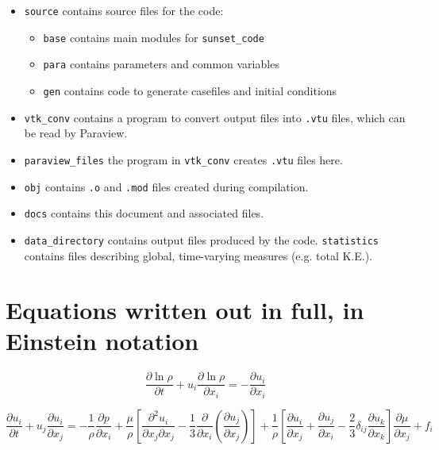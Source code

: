 \documentclass[notitlepage]{revtex4-1}
\begin{document}
\begin{itemize}
\item \verb|source| contains source files for the code:
\begin{itemize}
\item \verb|base| contains main modules for \verb|sunset_code|
\item \verb|para| contains parameters and common variables
\item \verb|gen| contains code to generate casefiles and initial conditions
\end{itemize}
\item \verb|vtk_conv| contains a program to convert output files into \verb|.vtu| files, which can be read by Paraview.
\item \verb|paraview_files| the program in \verb|vtk_conv| creates \verb|.vtu| files here.
\item \verb|obj| contains \verb|.o| and \verb|.mod| files created during compilation.
\item \verb|docs| contains this document and associated files.
\item \verb|data_directory| contains output files produced by the code. \verb|statistics| contains files describing global, time-varying measures (e.g. total K.E.).
\end{itemize}  

\appendix
\section{Equations written out in full, in Einstein notation}\label{fulleqns}

\begin{equation}\frac{\partial\ln\rho}{\partial{t}}+u_{i}\frac{\partial\ln\rho}{\partial{x}_{i}}=-\frac{\partial{u}_{i}}{\partial{x}_{i}}\end{equation}

\begin{equation}\frac{\partial{u}_{i}}{\partial{t}}+u_{j}\frac{\partial{u}_{i}}{\partial{x}_{j}}=-\frac{1}{\rho}\frac{\partial{p}}{\partial{x}_{i}}+\frac{\mu}{\rho}\left[\frac{\partial^{2}u_{i}}{\partial{x}_{j}\partial{x}_{j}}-\frac{1}{3}\frac{\partial}{\partial{x}_{i}}\left(\frac{\partial{u}_{j}}{\partial{x}_{j}}\right)\right]+\frac{1}{\rho}\left[\frac{\partial{u}_{i}}{\partial{x}_{j}}+\frac{\partial{u}_{j}}{\partial{x}_{i}}-\frac{2}{3}\delta_{ij}\frac{\partial{u}_{k}}{\partial{x}_{k}}\right]\frac{\partial\mu}{\partial{x}_{j}}+f_{i}\end{equation}
\end{document}
